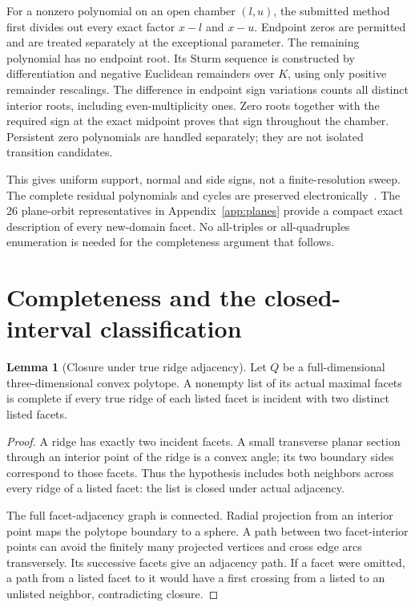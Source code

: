 \documentclass[11pt,a4paper]{article}
\theoremstyle{definition}
\newtheorem{lemma}[theorem]{Lemma}
\begin{document}
For a nonzero polynomial on an open chamber $(l,u)$, the submitted method first divides out every exact factor $x-l$ and $x-u$. Endpoint zeros are permitted and are treated separately at the exceptional parameter. The remaining polynomial has no endpoint root. Its Sturm sequence is constructed by differentiation and negative Euclidean remainders over $K$, using only positive remainder rescalings. The difference in endpoint sign variations counts all distinct interior roots, including even-multiplicity ones. Zero roots together with the required sign at the exact midpoint proves that sign throughout the chamber. Persistent zero polynomials are handled separately; they are not isolated transition candidates.

This gives uniform support, normal and side signs, not a finite-resolution sweep. The complete residual polynomials and cycles are preserved electronically~\cite{investigation}. The 26 plane-orbit representatives in Appendix~\ref{app:planes} provide a compact exact description of every new-domain facet. No all-triples or all-quadruples enumeration is needed for the completeness argument that follows.

\clearpage
\section{Completeness and the closed-interval classification}\label{sec:complete}
\begin{lemma}[Closure under true ridge adjacency]\label{lem:closure}
Let $Q$ be a full-dimensional three-dimensional convex polytope. A nonempty list of its actual maximal facets is complete if every true ridge of each listed facet is incident with two distinct listed facets.
\end{lemma}
\begin{proof}
A ridge has exactly two incident facets. A small transverse planar section through an interior point of the ridge is a convex angle; its two boundary sides correspond to those facets. Thus the hypothesis includes both neighbors across every ridge of a listed facet: the list is closed under actual adjacency.

The full facet-adjacency graph is connected. Radial projection from an interior point maps the polytope boundary to a sphere. A path between two facet-interior points can avoid the finitely many projected vertices and cross edge arcs transversely. Its successive facets give an adjacency path. If a facet were omitted, a path from a listed facet to it would have a first crossing from a listed to an unlisted neighbor, contradicting closure.
\end{proof}
\end{document}
